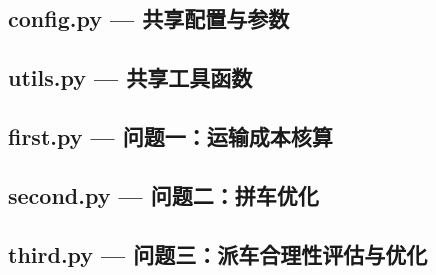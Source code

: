 \subsection{config.py — 共享配置与参数}



\subsection{utils.py — 共享工具函数}



\subsection{first.py — 问题一：运输成本核算}



\subsection{second.py — 问题二：拼车优化}



\subsection{third.py — 问题三：派车合理性评估与优化}


